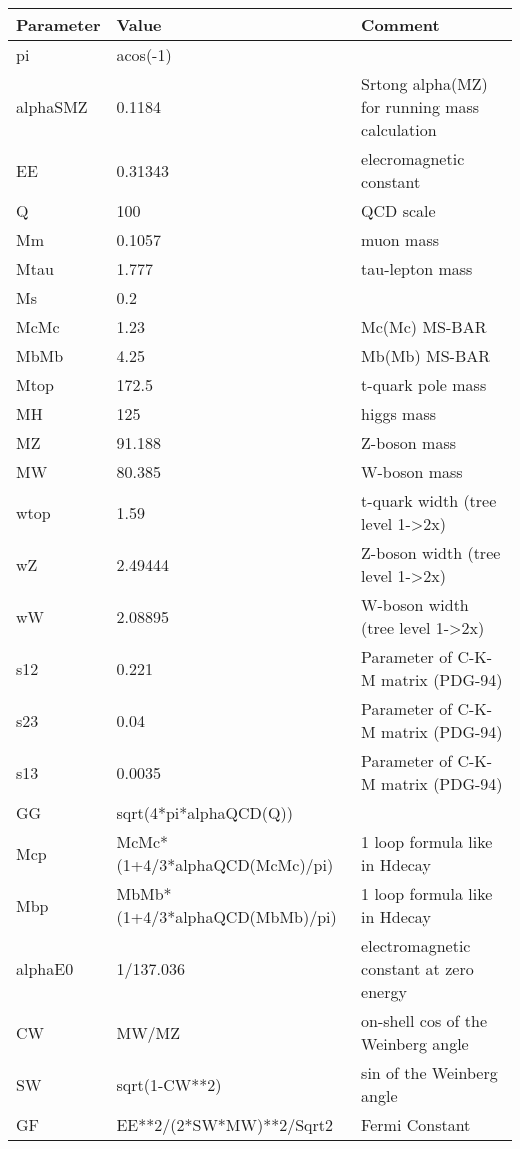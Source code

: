 \begin{tabular}{|l|l|l|} \hline
Parameter & Value & Comment \\ \hline
pi    &acos(-1)            & \\
alphaSMZ&0.1184              &Srtong alpha(MZ) for running mass calculation \\
EE    &0.31343             &elecromagnetic constant \\
Q     &100                 &QCD scale \\
Mm    &0.1057              &muon mass \\
Mtau  &1.777               &tau-lepton mass \\
Ms    &0.2                 & \\
McMc  &1.23                &Mc(Mc)  MS-BAR \\
MbMb  &4.25                &Mb(Mb)  MS-BAR \\
Mtop  &172.5               &t-quark pole mass \\
MH    &125                 &higgs mass \\
MZ    &91.188              &Z-boson mass \\
MW    &80.385              &W-boson mass \\
wtop  &1.59                &t-quark width (tree level 1->2x) \\
wZ    &2.49444             &Z-boson width        (tree level 1->2x) \\
wW    &2.08895             &W-boson width        (tree level 1->2x) \\
s12   &0.221               &Parameter of C-K-M matrix (PDG-94) \\
s23   &0.04                &Parameter of C-K-M matrix (PDG-94) \\
s13   &0.0035              &Parameter of C-K-M matrix (PDG-94) \\
GG    &sqrt(4*pi*alphaQCD(Q))& \\
Mcp   &McMc*(1+4/3*alphaQCD(McMc)/pi)&1 loop formula like in Hdecay \\
Mbp   &MbMb*(1+4/3*alphaQCD(MbMb)/pi)&1 loop formula like in Hdecay \\
alphaE0&1/137.036           &electromagnetic constant at zero energy \\
CW    &MW/MZ               &on-shell cos of the Weinberg angle \\
SW    &sqrt(1-CW**2)       &sin of the Weinberg angle \\
GF    &EE**2/(2*SW*MW)**2/Sqrt2&Fermi Constant \\

\end{tabular}
